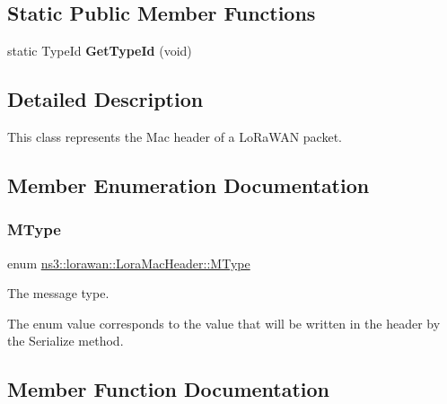 \subsection*{Static Public Member Functions}
\begin{DoxyCompactItemize}
\item 
\mbox{\label{classns3_1_1lorawan_1_1LoraMacHeader_afc0059a5892ab5aa8165be8ba657f88b}} 
static Type\+Id {\bfseries Get\+Type\+Id} (void)
\end{DoxyCompactItemize}


\subsection{Detailed Description}
This class represents the Mac header of a Lo\+Ra\+W\+AN packet. 

\subsection{Member Enumeration Documentation}
\mbox{\label{classns3_1_1lorawan_1_1LoraMacHeader_afd050ac67eab24871452323799e07e94}} 
\subsubsection{\texorpdfstring{M\+Type}{MType}}
{\footnotesize\ttfamily enum \hyperlink{classns3_1_1lorawan_1_1LoraMacHeader_afd050ac67eab24871452323799e07e94}{ns3\+::lorawan\+::\+Lora\+Mac\+Header\+::\+M\+Type}}

The message type.

The enum value corresponds to the value that will be written in the header by the Serialize method. 

\subsection{Member Function Documentation}
\mbox{\label{classns3_1_1lorawan_1_1LoraMacHeader_a76306a0ee9aec0f81f1655a16af3c273}} 
